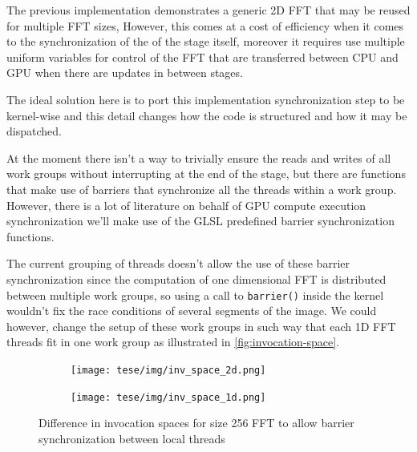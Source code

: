 \documentclass[
  oneside,
  11pt, a4paper,
  footinclude=true,
  headinclude=true,
  cleardoublepage=empty
]{scrbook}
\begin{document}
The previous implementation demonstrates a generic 2D FFT that may be reused for multiple FFT sizes, However, this comes at a cost of efficiency when it comes to the synchronization of the of the stage itself, moreover it requires use multiple uniform variables for control of the FFT that are transferred between CPU and GPU when there are updates in between stages.
\newline

The ideal solution here is to port this implementation synchronization step to be kernel-wise and this detail changes how the code is structured and how it may be dispatched.


At the moment there isn't a way to trivially ensure the reads and writes of all work groups  \cite{stuart2011efficient} without interrupting at the end of the stage, but there are functions that make use of barriers that synchronize all the threads within a work group. However, there is a lot of literature on behalf of GPU compute execution synchronization we'll make use of the GLSL predefined barrier synchronization functions.

The current grouping of threads doesn't allow the use of these barrier synchronization since the computation of one dimensional FFT is distributed between multiple work groups, so using a call to \texttt{barrier()} inside the kernel wouldn't fix the race conditions of several segments of the image. We could however, change the setup of these work groups in such way that each 1D FFT threads fit in one work group as illustrated in \autoref{fig:invocation-space}. 


\begin{figure}[h] 
    \begin{subfigure}{.5\textwidth}
        \centering
        \texttt{[image: tese/img/inv\_space\_2d.png]}
    \end{subfigure}
    \begin{subfigure}{.5\textwidth}
        \centering
        \texttt{[image: tese/img/inv\_space\_1d.png]}
    \end{subfigure}
    \caption{Difference in invocation spaces for size 256 FFT to allow barrier synchronization between local threads}
    \label{fig:invocation-space}
\end{figure}
\end{document}
